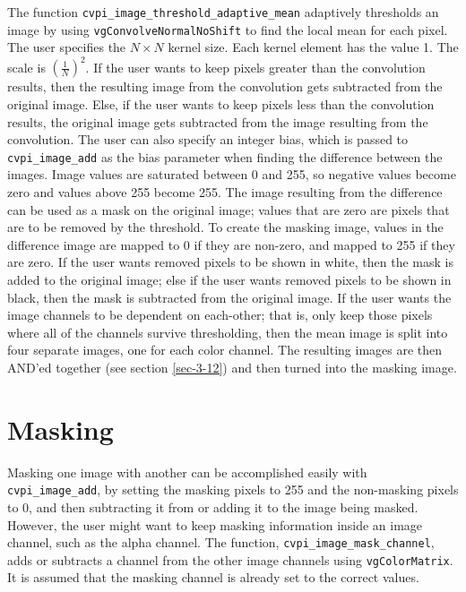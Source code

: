 \documentclass[12pt]{report}
\def\byX {\!\!\times\!\!}
\begin{document}
The function {\tt cvpi\_image\_threshold\_adaptive\_mean} adaptively
thresholds an image by using {\tt vgConvolveNormalNoShift} to find the
local mean for each pixel. The user specifies the $N\byX N$
kernel size. Each kernel element has the value 1. The scale is
$\left(\frac{1}{N}\right)^2$.  If the user wants to keep pixels
greater than the convolution results, then the resulting image from the
convolution gets subtracted from the original image. Else, if the
user wants to keep pixels less than the convolution results, the
original image gets subtracted from the image resulting from the
convolution. The user can also specify an integer bias, which is
passed to {\tt cvpi\_image\_add} as the bias parameter when finding the
difference between the images. Image values are saturated between 0
and 255, so negative values become zero and values above 255
become 255. The image resulting from the difference can be used as
a mask on the original image; values that are zero are pixels that
are to be removed by the threshold. To create the masking image,
values in the difference image are mapped to 0 if they are
non-zero, and mapped to 255 if they are zero. If the user wants
removed pixels to be shown in white, then the mask is added to the
original image; else if the user wants removed pixels to be shown
in black, then the mask is subtracted from the original image.
If the user wants the image channels to be dependent on each-other;
that is, only keep those pixels where all of the channels survive
thresholding, then the mean image is split into four separate
images, one for each color channel. The resulting images are then
AND'ed together (see section \ref{sec-3-12}) and then turned into the
masking image.

\section{Masking}
\label{sec-3-10}
Masking one image with another can be accomplished easily with
{\tt cvpi\_image\_add}, by setting the masking pixels to 255 and the
non-masking pixels to 0, and then subtracting it from or adding it
to the image being masked. However, the user might want to keep
masking information inside an image channel, such as the alpha
channel. The function, {\tt cvpi\_image\_mask\_channel}, adds or subtracts
a channel from the other image channels using {\tt vgColorMatrix}. It
is assumed that the masking channel is already set to the correct
values.
\end{document}
